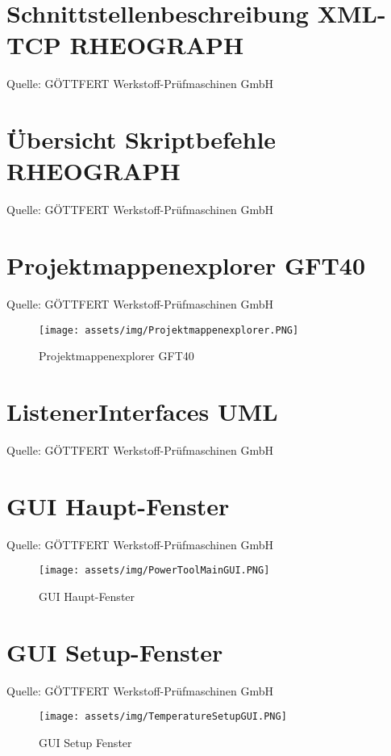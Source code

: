 \section{Schnittstellenbeschreibung XML-TCP RHEOGRAPH}\label{interface_description_xml-tcp}
Quelle: GÖTTFERT Werkstoff-Prüfmaschinen GmbH

\clearpage

\section{Übersicht Skriptbefehle RHEOGRAPH}\label{script_order_list}
Quelle: GÖTTFERT Werkstoff-Prüfmaschinen GmbH

\clearpage

\section{Projektmappenexplorer GFT40}
Quelle: GÖTTFERT Werkstoff-Prüfmaschinen GmbH
\begin{figure}[ht]
    \begin{center}
        \texttt{[image: assets/img/Projektmappenexplorer.PNG]}
        \caption{Projektmappenexplorer GFT40}
        \label{gft40_explorer}
    \end{center}
\end{figure}
\clearpage

\section{ListenerInterfaces UML} \label{uml_gft40}
Quelle: GÖTTFERT Werkstoff-Prüfmaschinen GmbH

\clearpage

\section{GUI Haupt-Fenster}
Quelle: GÖTTFERT Werkstoff-Prüfmaschinen GmbH
\begin{figure}[ht]
    \begin{center}
        \texttt{[image: assets/img/PowerToolMainGUI.PNG]}
        \caption{GUI Haupt-Fenster}
        \label{gui_mainWindow}
    \end{center}
\end{figure}
\clearpage

\section{GUI Setup-Fenster}
Quelle: GÖTTFERT Werkstoff-Prüfmaschinen GmbH
\begin{figure}[ht]
    \begin{center}
        \texttt{[image: assets/img/TemperatureSetupGUI.PNG]}
        \caption{GUI Setup Fenster}
        \label{gui_temperatureSetup}
    \end{center}
\end{figure}
\clearpage

